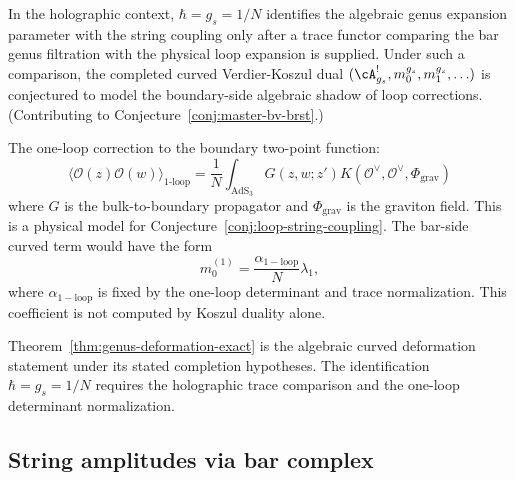 \begin{conjecture}
\label{conj:loop-string-coupling}
In the holographic context, $\hbar = g_s = 1/N$
identifies the algebraic genus expansion parameter with the string
coupling only after a trace functor comparing the bar genus filtration
with the physical loop expansion is supplied. Under such a comparison,
the completed curved Verdier-Koszul dual
$(\cA^!_{g_s},m_0^{g_s},m_1^{g_s},\ldots)$ is conjectured to model
the boundary-side algebraic shadow of loop corrections.
(Contributing to Conjecture~\ref{conj:master-bv-brst}.)
\end{conjecture}

\begin{example}
The one-loop correction to the boundary two-point
function:
\[
\langle \mathcal{O}(z) \mathcal{O}(w)
\rangle_{1\text{-loop}} = \frac{1}{N}
\int_{\mathrm{AdS}_3} G(z,w;z')
K(\mathcal{O}^{\vee}, \mathcal{O}^{\vee}, \Phi_{\mathrm{grav}})
\]
where $G$ is the bulk-to-boundary propagator and
$\Phi_{\mathrm{grav}}$ is the graviton field. This is a physical
model for Conjecture~\ref{conj:loop-string-coupling}. The bar-side
curved term would have the form
\[
m_0^{(1)}=\frac{\alpha_{\mathrm{1-loop}}}{N}\lambda_1,
\]
where $\alpha_{\mathrm{1-loop}}$ is fixed by the one-loop determinant
and trace normalization. This coefficient is not computed by Koszul
duality alone.
\end{example}

\begin{remark}
Theorem~\ref{thm:genus-deformation-exact} is the algebraic curved
deformation statement under its stated completion hypotheses. The
identification $\hbar=g_s=1/N$ requires the holographic trace
comparison and the one-loop determinant normalization.
\end{remark}


\subsection{String amplitudes via bar complex}

